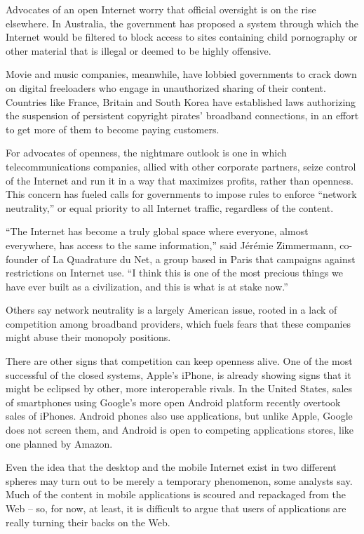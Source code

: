 ﻿\documentclass[12pt]{article}
\begin{document}
Advocates of an open Internet worry that official oversight is on the rise elsewhere. In Australia,
the government has proposed a system through which the Internet would be filtered to block access to
sites containing child pornography or other material that is illegal or deemed to be highly
offensive.

Movie and music companies, meanwhile, have lobbied governments to crack down on digital freeloaders
who engage in unauthorized sharing of their content. Countries like France, Britain and South Korea
have established laws authorizing the suspension of persistent copyright pirates' broadband
connections, in an effort to get more of them to become paying customers.

For advocates of openness, the nightmare outlook is one in which telecommunications companies,
allied with other corporate partners, seize control of the Internet and run it in a way that
maximizes profits, rather than openness. This concern has fueled calls for governments to impose
rules to enforce ``network neutrality,'' or equal priority to all Internet traffic, regardless of
the content.

``The Internet has become a truly global space where everyone, almost everywhere, has access to the
same information,'' said J\'er\'emie Zimmermann, co-founder of La Quadrature du Net, a group based
in Paris that campaigns against restrictions on Internet use. ``I think this is one of the most
precious things we have ever built as a civilization, and this is what is at stake now.''

Others say network neutrality is a largely American issue, rooted in a lack of competition among
broadband providers, which fuels fears that these companies might abuse their monopoly positions.

There are other signs that competition can keep openness alive. One of the most successful of the
closed systems, Apple's iPhone, is already showing signs that it might be eclipsed by other, more
interoperable rivals. In the United States, sales of smartphones using Google's more open Android
platform recently overtook sales of iPhones. Android phones also use applications, but unlike Apple,
Google does not screen them, and Android is open to competing applications stores, like one planned
by Amazon.

Even the idea that the desktop and the mobile Internet exist in two different spheres may turn out
to be merely a temporary phenomenon, some analysts say. Much of the content in mobile applications
is scoured and repackaged from the Web -- so, for now, at least, it is difficult to argue that users
of applications are really turning their backs on the Web.
\end{document}
